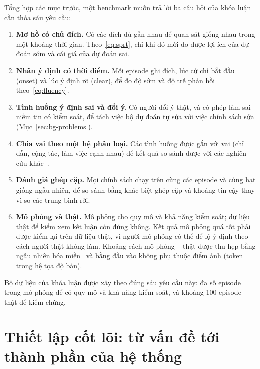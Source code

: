 Tổng hợp các mục trước, một benchmark muốn trả lời ba câu hỏi của khóa luận cần thỏa sáu yêu cầu:
\begin{enumerate}
  \item \textbf{Mơ hồ có chủ đích.} Có các đích đủ gần nhau để quan sát giống nhau trong một khoảng thời gian. Theo~\eqref{eq:sprt}, chỉ khi đó mới đo được lợi ích của dự đoán sớm và cái giá của dự đoán sai.
  \item \textbf{Nhãn ý định có thời điểm.} Mỗi episode ghi đích, lúc cử chỉ bắt đầu (onset) và lúc ý định rõ (clear), để đo độ sớm và độ trễ phản hồi theo~\eqref{eq:fluency}.
  \item \textbf{Tình huống ý định sai và đổi ý.} Có người đổi ý thật, và có phép làm sai niềm tin có kiểm soát, để tách việc bộ dự đoán tự sửa với việc chính sách sửa (Mục~\ref{sec:bg-problems}).
  \item \textbf{Chia vai theo một hệ phân loại.} Các tình huống được gắn với vai (chỉ dẫn, cộng tác, làm việc cạnh nhau) để kết quả so sánh được với các nghiên cứu khác~\cite{onnasch2021taxonomy,song2026habit}.
  \item \textbf{Đánh giá ghép cặp.} Mọi chính sách chạy trên cùng các episode và cùng hạt giống ngẫu nhiên, để so sánh bằng khác biệt ghép cặp và khoảng tin cậy thay vì so các trung bình rời.
  \item \textbf{Mô phỏng và thật.} Mô phỏng cho quy mô và khả năng kiểm soát; dữ liệu thật để kiểm xem kết luận còn đúng không. Kết quả mô phỏng quá tốt phải được kiểm lại trên dữ liệu thật, vì người mô phỏng có thể để lộ ý định theo cách người thật không làm. Khoảng cách mô phỏng -- thật được thu hẹp bằng ngẫu nhiên hóa miền~\cite{tobin2017domain} và bằng đầu vào không phụ thuộc điểm ảnh (token trong hệ tọa độ bàn).
\end{enumerate}
Bộ dữ liệu của khóa luận được xây theo đúng sáu yêu cầu này: đa số episode trong mô phỏng để có quy mô và khả năng kiểm soát, và khoảng 100 episode thật để kiểm chứng.

\section{Thiết lập cốt lõi: từ vấn đề tới thành phần của hệ thống}
\label{sec:bg-limitations}

